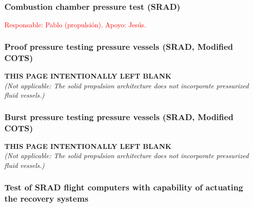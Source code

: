 \documentclass[11pt, a4paper]{article} %
\begin{document}
\subsubsection{Combustion chamber pressure test (SRAD)} \textcolor{red}{Responsable: Pablo (propulsión). Apoyo: Jesús.}

\subsubsection{Proof pressure testing pressure vessels (SRAD, Modified COTS)}
\vspace*{\fill}
\begin{center}
    \textbf{THIS PAGE INTENTIONALLY LEFT BLANK} \\
    \vspace{0.5cm}
    \textit{(Not applicable: The solid propulsion architecture does not incorporate pressurized fluid vessels.)}
\end{center}
\vspace*{\fill}
\newpage

\subsubsection{Burst pressure testing pressure vessels (SRAD, Modified COTS)}
\vspace*{\fill}
\begin{center}
    \textbf{THIS PAGE INTENTIONALLY LEFT BLANK} \\
    \vspace{0.5cm}
    \textit{(Not applicable: The solid propulsion architecture does not incorporate pressurized fluid vessels.)}
\end{center}
\vspace*{\fill}
\newpage

\subsubsection{Test of SRAD flight computers with capability of actuating the recovery systems}
\end{document}
